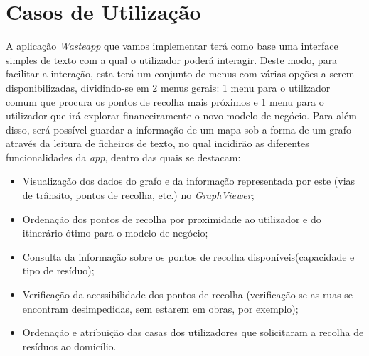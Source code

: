 \documentclass[article, a4paper, 12pt, oneside]{memoir}
\begin{document}
\chapter[Casos de Utilização][Casos de Utilização]{Casos de Utilização} \label{\thechapter}

A aplicação \textit{Wasteapp} que vamos implementar terá como base uma interface simples de texto com a qual o utilizador poderá interagir. Deste modo, para facilitar a interação, esta terá um conjunto de menus com várias opções a serem disponibilizadas, dividindo-se em 2 menus gerais: 1 menu para o utilizador comum que procura os pontos de recolha mais próximos e 1 menu para o utilizador que irá explorar financeiramente o novo modelo de negócio.
Para além disso, será possível guardar a informação de um mapa sob a forma de um grafo através da leitura de ficheiros de texto, no qual incidirão as diferentes funcionalidades da \textit{app}, dentro das quais se destacam:

\begin{itemize}
\item Visualização dos dados do grafo e da informação representada por este (vias de trânsito, pontos de recolha, etc.) no \textit{GraphViewer};
\item Ordenação dos pontos de recolha por proximidade ao utilizador e do itinerário ótimo para o modelo de negócio;
\item Consulta da informação sobre os pontos de recolha disponíveis(capacidade e tipo de resíduo);
\item Verificação da acessibilidade dos pontos de recolha (verificação se as ruas se encontram desimpedidas, sem estarem em obras, por exemplo);
\item Ordenação e atribuição das casas dos utilizadores que solicitaram a recolha de resíduos ao domicílio.

\end{itemize}
\end{document}
